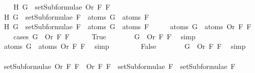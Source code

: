 \begin{isabellebody}
\ \ \isamarkupfalse%
\ H{}{\isacharcolon}\ {\isachardoublequoteopen}G\ {\isasymin}\ setSubformulae\ {\isacharparenleft}Or\ F{}\ F{}{\isacharparenright}{\isachardoublequoteclose}\isanewline
\ \ \isamarkupfalse%
\ H{}{\isacharcolon}\ {\isachardoublequoteopen}G\ {\isasymin}\ setSubformulae\ F{}\ {\isasymLongrightarrow}\ atoms\ G\ {\isasymsubseteq}\ atoms\ F{}{\isachardoublequoteclose}\isanewline
\ \ \isamarkupfalse%
\ H{}{\isacharcolon}\ {\isachardoublequoteopen}G\ {\isasymin}\ setSubformulae\ F{}\ {\isasymLongrightarrow}\ atoms\ G\ {\isasymsubseteq}\ atoms\ F{}{\isachardoublequoteclose}\isanewline
\ \ \isamarkupfalse%
\ \isamarkupfalse%
\ {\isachardoublequoteopen}atoms\ G\ {\isasymsubseteq}\ atoms\ {\isacharparenleft}Or\ F{}\ F{}{\isacharparenright}{\isachardoublequoteclose}\isanewline
\ \ \isamarkupfalse%
\ {\isacharparenleft}cases\ {\isachardoublequoteopen}G\ {\isacharequal}\ Or\ F{}\ F{}{\isachardoublequoteclose}{\isacharparenright}\isanewline
\ \ \ \ \isamarkupfalse%
\ True\isanewline
\ \ \ \ \isamarkupfalse%
\ \isamarkupfalse%
\ {\isachardoublequoteopen}G\ {\isacharequal}\ Or\ F{}\ F{}{\isachardoublequoteclose}\ \isamarkupfalse%
\ simp\isanewline
\ \ \ \ \isamarkupfalse%
\ \isamarkupfalse%
\ {\isachardoublequoteopen}atoms\ G\ {\isasymsubseteq}\ atoms\ {\isacharparenleft}Or\ F{}\ F{}{\isacharparenright}{\isachardoublequoteclose}\ \isamarkupfalse%
\ simp\isanewline
\ \ \isamarkupfalse%
\isanewline
\ \ \ \ \isamarkupfalse%
\ False\isanewline
\ \ \ \ \isamarkupfalse%
\ \isamarkupfalse%
\ {}{\isacharcolon}{\isachardoublequoteopen}G\ {\isasymnoteq}\ Or\ F{}\ F{}{\isachardoublequoteclose}\ \isamarkupfalse%
\ simp\isanewline
\ \ \ \ \isamarkupfalse%
\ {\isachardoublequoteopen}setSubformulae\ {\isacharparenleft}Or\ F{}\ F{}{\isacharparenright}\ {\isacharequal}\ {\isacharbraceleft}Or\ F{}\ F{}{\isacharbraceright}\ {\isasymunion}\ setSubformulae\ F{}\ {\isasymunion}\ setSubformulae\ F{}{\isachardoublequoteclose}\ \isamarkupfalse%

\end{isabellebody}
